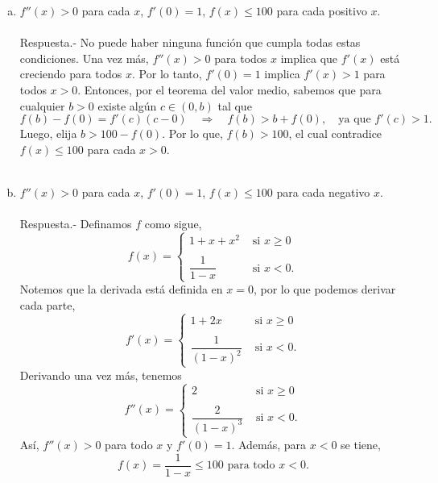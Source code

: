 \begin{enumerate}[\bfseries 1.]
\begin{enumerate}[(a)]
	    \item $f''(x)>0$ para cada $x$, $f'(0)=1$, $f(x)\leq 100$ para cada positivo $x$.\\\\
		Respuesta.-\; No puede haber ninguna función que cumpla todas estas condiciones. Una vez más, $f''(x) > 0$ para todos $x$ implica que $f'(x)$ está creciendo para todos $x$. Por lo tanto, $f'(0) = 1$ implica $f'(x) > 1$ para todos $x > 0$. Entonces, por el teorema del valor medio, sabemos que para cualquier $b > 0$ existe algún $c \in (0,b)$ tal que
		$$f(b)-f(0)=f'(c)(c-0)\quad \Rightarrow \quad f(b)>b+f(0),\quad \mbox{ya que }f'(c)>1.$$
		Luego, elija $b>100-f(0)$. Por lo que, $f(b)>100$, el cual contradice $f(x)\leq 100$ para cada $x>0$.\\\\

	    \item $f''(x)>0$ para cada $x$, $f'(0)=1$, $f(x)\leq 100$ para cada negativo $x$.\\\\
		Respuesta.-\; Definamos $f$ como sigue,
		$$f(x)=\left\{\begin{array}{ll}
		    1+x+x^2&\mbox{ si }x\geq 0\\\\
		    \dfrac{1}{1-x}&\mbox{ si }x<0.
		\end{array}\right.$$
		Notemos que la derivada está definida en $x=0$, por lo que podemos derivar cada parte,
		$$f'(x)=\left\{\begin{array}{ll}
		    1+2x&\mbox{ si }x\geq 0\\\\
		    \dfrac{1}{(1-x)^2}&\mbox{ si }x<0.
		\end{array}\right.$$
		Derivando una vez más, tenemos
		$$f''(x)=\left\{\begin{array}{ll}
		    2&\mbox{ si }x\geq 0\\\\
		    \dfrac{2}{(1-x)^3}&\mbox{ si }x<0.
		\end{array}\right.$$
		Así, $f''(x)>0$ para todo $x$ y $f'(0)=1$. Además, para $x<0$ se tiene,
		$$f(x)=\dfrac{1}{1-x}\leq 100\mbox{ para todo }x<0.$$\\
		
	\end{enumerate}


\end{enumerate}
